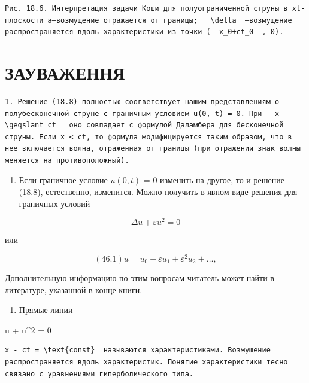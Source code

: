 \documentclass[
  ukrainian,
]{article}
\providecommand{\tightlist}{%
  \setlength{\itemsep}{0pt}\setlength{\parskip}{0pt}}
\begin{document}
\begin{verbatim}
Рис. 18.6. Интерпретация задачи Коши для полуограниченной струны в xt-плоскости a—возмущение отражается от границы;   \delta  —возмущение распространяется вдоль характеристики из точки (  x_0+ct_0  , 0).
\end{verbatim}

\section{ЗАУВАЖЕННЯ}\label{ux437ux430ux443ux432ux430ux436ux435ux43dux43dux44f-1}

\begin{verbatim}
1. Решение (18.8) полностью соогветствует нашим представлениям о полубесконечной струне с граничным условием u(0, t) = 0. При   x \geqslant ct   оно совпадает с формулой Даламбера для бесконечной струны. Если x < ct, то формула модифицируется таким образом, что в нее включается волна, отраженная от границы (при отражении знак волны меняется на противоположный).
\end{verbatim}

\begin{enumerate}
\def\labelenumi{\arabic{enumi}.}
\setcounter{enumi}{1}
\tightlist
\item
  Если граничное условие \(u(0, t)\) = 0 изменить на другое, то и
  решение (18.8), естественно, изменится. Можно получить в явном виде
  решения для граничных условий
\end{enumerate}

\[
\Delta u + \varepsilon u^2 = 0
\]

или

\[
(46.1) u = u_0 + \varepsilon u_1 + \varepsilon^2 u_2 + \dots,
\]

Дополнительную информацию по этим вопросам читатель может найти в
литературе, указанной в конце книги.

\begin{enumerate}
\def\labelenumi{\arabic{enumi}.}
\setcounter{enumi}{2}
\tightlist
\item
  Прямые линии
\end{enumerate}

 u + u\^{}2 = 0

\begin{verbatim}
x - ct = \text{const}  называются характеристиками. Возмущение распространяется вдоль характеристик. Понятие характеристики тесно связано с уравнениями гиперболического типа.
\end{verbatim}
\end{document}
